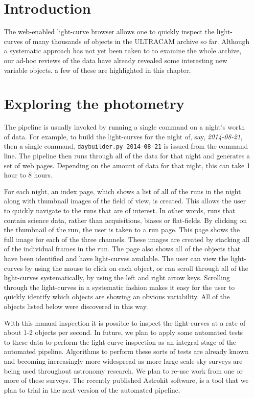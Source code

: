 \section{Introduction}
The web-enabled light-curve browser allows one to quickly inspect the light-curves of many thousands of objects in the ULTRACAM archive so far. Although a systematic approach has not yet been taken to to examine the whole archive, our ad-hoc reviews of the data have already revealed some interesting new variable objects. a few of these are highlighted in this chapter. 

\section{Exploring the photometry}
The pipeline is usually invoked by running a single command on a night's worth of data. For example, to build the light-curves for the night of, say, \emph{2014-08-21}, then a single command, \texttt{daybuilder.py 2014-08-21} is issued from the command line. The pipeline then runs through all of the data for that night and generates a set of web pages. Depending on the amount of data for that night, this can take 1 hour to 8 hours. 

For each night, an index page, which shows a list of all of the runs in the night along with thumbnail images of the field of view, is created. This allows the user to quickly navigate to the runs that are of interest. In other words, runs that contain science data, rather than acquisitions, biases or flat-fields. By clicking on the thumbnail of the run, the user is taken to a run page. This page shows the full image for each of the three channels. These images are created by stacking all of the individual frames in the run. The page also shows all of the objects that have been identified and have light-curves available. The user can view the light-curves by using the mouse to click on each object, or can scroll through all of the light-curves systematically, by using the left and right arrow keys. Scrolling through the light-curves in a systematic fashion makes it easy for the user to quickly identify which objects are showing an obvious variability. All of the objects listed below were discovered in this way. 

With this manual inspection it is possible to inspect the light-curves at a rate of about 1-2 objects per second. In future, we plan to apply some automated tests to these data to perform the light-curve inspection as an integral stage of the automated pipeline. Algorithms to perform these sorts of tests are already known and becoming increasingly more widespread as more large scale sky surveys are being used throughout astronomy research. We plan to re-use work from one or more of these surveys. The recently published Astrokit software, \citep{Astrokit2014} is a tool that we plan to trial in the next version of the automated pipeline. 

